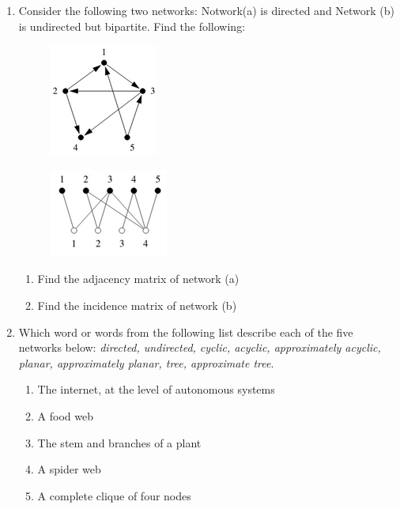 \documentclass{amsart}
\theoremstyle{definition}
\theoremstyle{remark}
\numberwithin{equation}{section}
\begin{document}
\begin{enumerate}
\item Consider the following two networks: Notwork(a) is directed and Network (b) is undirected but bipartite. Find the following:
\begin{figure}[h]
\includegraphics[width=0.4\linewidth]{images/networka.PNG}
\end{figure}

\begin{figure}[h]
\includegraphics[width=0.4\linewidth]{images/networkb.PNG}
\end{figure}
\begin{enumerate}
\item Find the adjacency matrix of network (a)
\item Find the incidence matrix of network (b)
\end{enumerate}

\vspace{5cm}

\clearpage
\item Which word or words from the following list describe each of the five networks below: {\em directed, undirected, cyclic, acyclic, approximately acyclic, planar, approximately planar, tree, approximate tree}.
\begin{enumerate}
\item The internet, at the level of autonomous systems
\item A food web
\item The stem and branches of a plant
\item A spider web
\item A complete clique of four nodes
\end{enumerate}


\end{enumerate}
\end{document}
